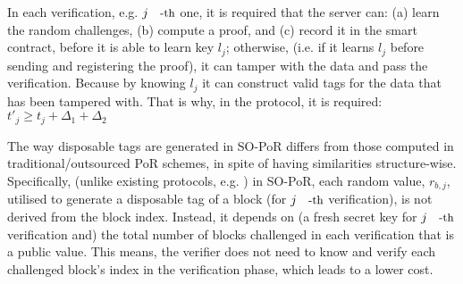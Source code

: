 





\begin{remark}
 In each verification, e.g. $j\text{\small{-th}}$ one, it is required that the server can: (a) learn the random challenges, (b) compute a proof, and (c) record it in the smart contract, before it is able to learn key $l_{\scriptscriptstyle j}$; otherwise, (i.e. if it learns $l_{\scriptscriptstyle j}$ before sending and registering the proof), it can tamper with the data and pass the verification. Because by knowing $l_{\scriptscriptstyle j}$ it can construct valid tags for the data that has been tampered with. That is why, in the protocol, it is required: $t'_{\scriptscriptstyle j}\geq t_{\scriptscriptstyle j}+\Delta_{\scriptscriptstyle 1}+\Delta_{\scriptscriptstyle 2}$
\end{remark}


\begin{remark}
The way disposable tags are generated in SO-PoR  differs from those computed  in traditional/outsourced PoR schemes, in spite of having similarities structure-wise. Specifically, (unlike existing protocols, e.g. \cite{DBLP:conf/asiacrypt/ShachamW08,armknecht2014outsourced}) in SO-PoR, each random value, $r_{\scriptscriptstyle b,j}$, utilised to generate a disposable tag of a  block (for $j\text{\small{-th}}$ verification), is not derived from the block index. Instead, it depends on (a  fresh secret key for $j\text{\small{-th}}$ verification and) the total number of blocks challenged in each verification that is a public value. This means, the verifier does not need to know and verify each challenged block's index in the verification phase, which leads to a lower cost.  
\end{remark}

